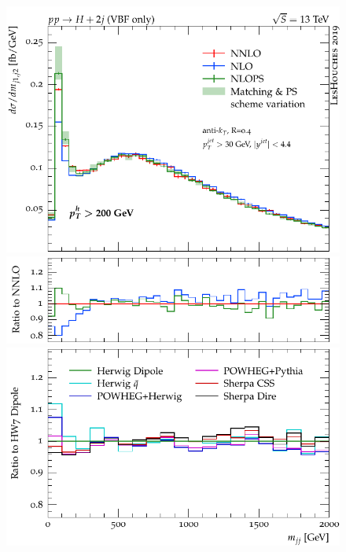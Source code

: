 \documentclass[10pt,prd,fleqn,superscriptaddress,notitlepage,nofootinbib,preprintnumbers,nobalancelastpage]{revtex4-1}
\begin{document}
\begin{figure}[tp]
\begin{minipage}{.32\textwidth}
    \includegraphics[width=\textwidth]{figures/tools/m_jj12_pth200.pdf}
    \includegraphics[width=\textwidth]{figures/tools/m_jj12_pth200_rFO.pdf}
    \includegraphics[width=\textwidth]{figures/tools/m_jj12_pth200_rMC.pdf}
  \end{minipage}\hfill
  \begin{minipage}{.32\textwidth}

\end{minipage}
\end{figure}
\end{document}
